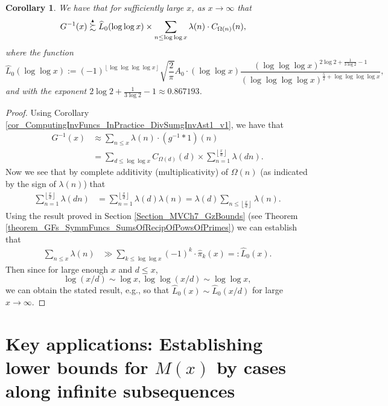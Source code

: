 \documentclass[11pt,reqno,a4letter]{article}
\numberwithin{figure}{section}
\numberwithin{table}{section}
\newcommand{\floor}[1]{\left\lfloor #1 \right\rfloor}
\newcommand{\Floor}[2]{\ensuremath{\left\lfloor \frac{#1}{#2} \right\rfloor}}
\theoremstyle{plain}
\newtheorem{cor}[theorem]{Corollary}
\numberwithin{theorem}{section}
\theoremstyle{definition}
\newcommand{\NBRef}[1]{
     \todo[linecolor=green!85!white,backgroundcolor=orange!50!white,bordercolor=blue!30!black,textcolor=cyan!15!black,shadow,size=\small,fancyline]{
     \color{NBRefColor}{\textbf{#1}
     }
     }
}
\newcommand{\SuccSim}[0]{\overset{_{\scriptsize{\blacktriangle}}}{\succsim}}
\begin{document}
\begin{cor} 
\label{cor_ASemiForm_ForGInvx_v1} 
We have that for sufficiently large $x$, as $x \rightarrow \infty$ that 
\begin{align*} 
G^{-1}(x) & \SuccSim \widehat{L}_0(\log\log x) \times \sum_{n \leq \log\log x} 
     \lambda(n) \cdot C_{\Omega(n)}(n), 
\end{align*} 
where the function 
\[
\widehat{L}_0(\log\log x) := (-1)^{\floor{\log\log\log\log x}} 
     \sqrt{\frac{2}{\pi}} A_0 \cdot (\log\log x) 
     \frac{(\log\log\log x)^{2\log 2+ \frac{1}{3 \log 2} - 1}}{ 
     (\log\log\log\log x)^{\frac{5}{2} + \log\log\log\log x}}, 
\]
and with the exponent $2\log 2+ \frac{1}{3 \log 2} - 1 \approx 0.867193$. 
\end{cor} 
\NBRef{A10-2020.04-26} 
\begin{proof} 
Using Corollary \ref{cor_ComputingInvFuncs_InPractice_DivSumgInvAst1_v1}, we have that 
\begin{align*} 
G^{-1}(x) & \approx \sum_{n \leq x} \lambda(n) \cdot (g^{-1} \ast 1)(n) \\ 
     & = \sum_{d \leq \log\log x} C_{\Omega(d)}(d) \times \sum_{n=1}^{\Floor{x}{d}} \lambda(dn). 
\end{align*} 
Now we see that by complete additivity (multiplicativity) of $\Omega(n)$ 
(as indicated by the sign of $\lambda(n)$) that 
\begin{align*} 
\sum_{n=1}^{\Floor{x}{d}} \lambda(dn) & = \sum_{n=1}^{\Floor{x}{d}} \lambda(d) \lambda(n) 
     = \lambda(d) \sum_{n \leq \Floor{x}{d}} \lambda(n). 
\end{align*} 
Using the result proved in Section \ref{Section_MVCh7_GzBounds} 
(see Theorem \ref{theorem_GFs_SymmFuncs_SumsOfRecipOfPowsOfPrimes})
we can establish that 
\begin{align*} 
\sum_{n \leq x} \lambda(n) & \gg \sum_{k \leq \log\log x} (-1)^k \cdot \widehat{\pi}_k(x) 
     =: \widehat{L}_0(x). 
\end{align*} 
Then since for large enough $x$ and $d \leq x$, 
\[
\log(x/d) \sim \log x, \log\log(x/d) \sim \log\log x, 
\] 
we can obtain the stated result, e.g., so that 
$\widehat{L}_0(x) \sim \widehat{L}_0(x/d)$ for large $x \rightarrow \infty$. 
\end{proof} 

\newpage
\section{Key applications: Establishing lower bounds for $M(x)$ by cases along infinite subsequences} 
\label{Section_KeyApplications} 
\end{document}
